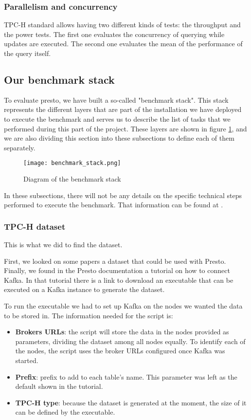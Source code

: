 \documentclass[conference]{IEEEtran}
\begin{document}
\subsubsection{Parallelism and concurrency}
TPC-H standard allows having two different kinds of tests: the throughput and the power tests. The first one evaluates the concurrency of querying while updates are executed. The second one evaluates the mean of the performance of the query itself.

\subsection{Our benchmark stack}
To evaluate presto, we have built a so-called "benchmark stack". This stack represents the different layers that are part of the installation we have deployed to execute the benchmark and serves us to describe the list of tasks that we performed during this part of the project.
These layers are shown in figure \ref{benchmark_stack}, and we are also dividing this section into these subsections to define each of them separately.

\begin{figure}[htbp]
\centerline{\texttt{[image: benchmark\_stack.png]}}
\caption{Diagram of the benchmark stack}
\label{benchmark_stack}
\end{figure}

In these subsections, there will not be any details on the specific technical steps performed to execute the benchmark. That information can be found at \cite{perez-rodriguez-2021}.

\subsubsection{TPC-H dataset}
This is what we did to find the dataset.

First, we looked on some papers a dataset that could be used with Presto. \cite{ciritoglu-2020} \cite{qin-2017} \cite{valuko-2018} Finally, we found in the Presto documentation a tutorial on how to connect Kafka. \cite{the-presto-foundation-no-date} In that tutorial there is a link to download an executable that can be executed on a Kafka instance to generate the dataset.

To run the executable we had to set up Kafka on the nodes we wanted the data to be stored in. The information needed for the script is:

\begin{itemize}
    \item \textbf{Brokers URLs}: the script will store the data in the nodes provided as parameters, dividing the dataset among all nodes equally. To identify each of the nodes, the script uses the broker URLs configured once Kafka was started.
    \item \textbf{Prefix}: prefix to add to each table's name. This parameter was left as the default shown in the tutorial.
    \item \textbf{TPC-H type}: because the dataset is generated at the moment, the size of it can be defined by the executable.
\end{itemize}
\end{document}
